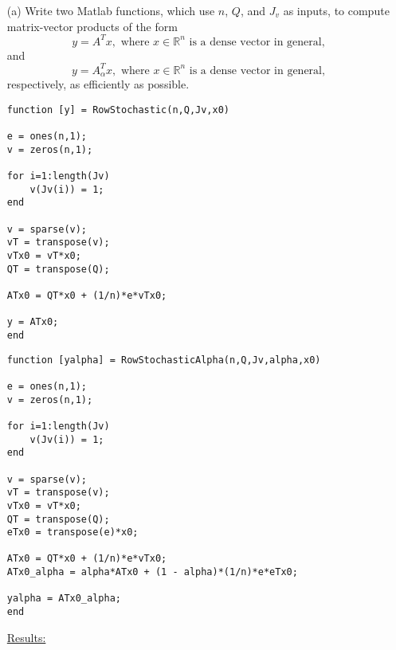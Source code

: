 \documentclass[12pt]{article}
\def\R{\mathbb{R}}
\begin{document}
\begin{itemize}
\item[(a)] Write two Matlab functions, which use $n$, $Q$, and $J_v$ as inputs, to compute matrix-vector products of the form
$$y = A^Tx, \text{ where } x \in \R^n \text{ is a dense vector in general,}$$
and
$$y = A^T_{\alpha}x, \text{ where } x \in \R^n \text{ is a dense vector in general,}$$
respectively, as efficiently as possible.\\

\lstset{language=matlab,frame=single}
\begin{lstlisting}[caption=Matrix-Vector Product of Row Stochastic Matrix]
function [y] = RowStochastic(n,Q,Jv,x0)

e = ones(n,1);
v = zeros(n,1);

for i=1:length(Jv)
    v(Jv(i)) = 1;
end

v = sparse(v);
vT = transpose(v);
vTx0 = vT*x0;
QT = transpose(Q);

ATx0 = QT*x0 + (1/n)*e*vTx0;

y = ATx0;
end
\end{lstlisting}

\lstset{language=matlab,frame=single}
\begin{lstlisting}[caption=Matrix-Vector Product of Row Stochastic Matrix with $\alpha$]
function [yalpha] = RowStochasticAlpha(n,Q,Jv,alpha,x0)

e = ones(n,1);
v = zeros(n,1);

for i=1:length(Jv)
    v(Jv(i)) = 1;
end

v = sparse(v);
vT = transpose(v);
vTx0 = vT*x0;
QT = transpose(Q);
eTx0 = transpose(e)*x0;

ATx0 = QT*x0 + (1/n)*e*vTx0;
ATx0_alpha = alpha*ATx0 + (1 - alpha)*(1/n)*e*eTx0;

yalpha = ATx0_alpha;
end
\end{lstlisting}

\newpage
\underline{Results:}
	

\end{itemize}
\end{document}
